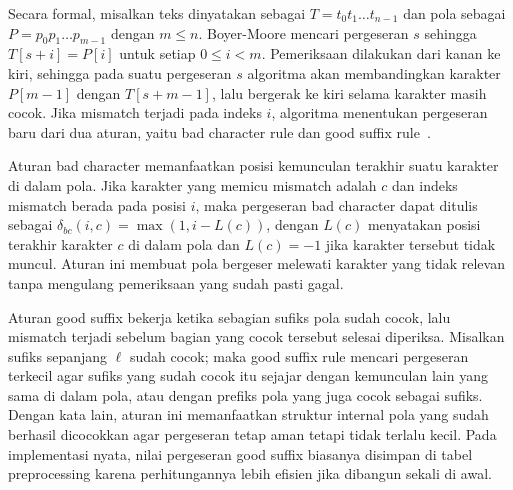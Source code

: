 Secara formal, misalkan teks dinyatakan sebagai $T = t_0 t_1 \dots t_{n-1}$ dan pola sebagai $P = p_0 p_1 \dots p_{m-1}$ dengan $m \leq n$. Boyer-Moore mencari pergeseran $s$ sehingga $T[s+i] = P[i]$ untuk setiap $0 \leq i < m$. Pemeriksaan dilakukan dari kanan ke kiri, sehingga pada suatu pergeseran $s$ algoritma akan membandingkan karakter $P[m-1]$ dengan $T[s+m-1]$, lalu bergerak ke kiri selama karakter masih cocok. Jika mismatch terjadi pada indeks $i$, algoritma menentukan pergeseran baru dari dua aturan, yaitu bad character rule dan good suffix rule \,\cite{boyer1977fast}.

Aturan bad character memanfaatkan posisi kemunculan terakhir suatu karakter di dalam pola. Jika karakter yang memicu mismatch adalah $c$ dan indeks mismatch berada pada posisi $i$, maka pergeseran bad character dapat ditulis sebagai $\delta_{bc}(i,c) = \max(1, i - L(c))$, dengan $L(c)$ menyatakan posisi terakhir karakter $c$ di dalam pola dan $L(c) = -1$ jika karakter tersebut tidak muncul. Aturan ini membuat pola bergeser melewati karakter yang tidak relevan tanpa mengulang pemeriksaan yang sudah pasti gagal.

Aturan good suffix bekerja ketika sebagian sufiks pola sudah cocok, lalu mismatch terjadi sebelum bagian yang cocok tersebut selesai diperiksa. Misalkan sufiks sepanjang $\ell$ sudah cocok; maka good suffix rule mencari pergeseran terkecil agar sufiks yang sudah cocok itu sejajar dengan kemunculan lain yang sama di dalam pola, atau dengan prefiks pola yang juga cocok sebagai sufiks. Dengan kata lain, aturan ini memanfaatkan struktur internal pola yang sudah berhasil dicocokkan agar pergeseran tetap aman tetapi tidak terlalu kecil. Pada implementasi nyata, nilai pergeseran good suffix biasanya disimpan di tabel preprocessing karena perhitungannya lebih efisien jika dibangun sekali di awal.



